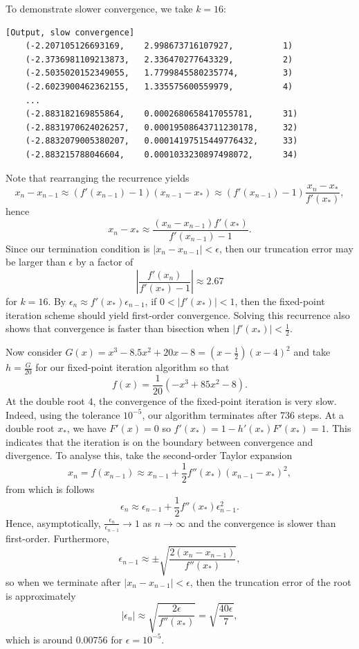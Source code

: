 \documentclass{article}
\begin{document}
To demonstrate slower convergence, we take \(k = 16\):

\begin{verbatim}[Output, slow convergence]
    (-2.207105126693169,    2.998673716107927,          1)
    (-2.3736981109213873,   2.336470277643329,          2)
    (-2.5035020152349055,   1.7799845580235774,         3)
    (-2.6023900462362155,   1.335575600559979,          4)
    ...
    (-2.883182169855864,    0.0002680658417055781,      31)
    (-2.8831970624026257,   0.00019508643711230178,     32)
    (-2.8832079005380207,   0.00014197515449776432,     33)
    (-2.883215788046604,    0.0001033230897498072,      34)
\end{verbatim}

Note that rearranging the recurrence yields
\[ x_n - x_{n-1} \approx (f'(x_{n-1}) - 1)(x_{n-1} - x_*) \approx  (f'(x_{n-1}) - 1) \frac{x_n - x_*}{f'(x_*)}, \]
hence
\[ x_n - x_* \approx \frac{(x_n - x_{n-1})f'(x_*)}{f'(x_{n-1}) - 1}. \]
Since our termination condition is \(|x_n - x_{n-1}| < \epsilon\), then our truncation error may be larger than \(\epsilon\) by a factor of 
\[ \left|\frac{f'(x_n)}{f'(x_*) - 1}\right| \approx 2.67 \]
for \(k = 16\). By \(\epsilon_n \approx f'(x_*) \epsilon_{n-1}\), if \(0 < |f'(x_*)| < 1\), then the fixed-point iteration scheme should yield first-order convergence. Solving this recurrence also shows that convergence is faster than bisection when \(|f'(x_*)| < \frac{1}{2}\).

Now consider \(G(x) = x^3 -8.5x^2 + 20x - 8 = (x - \frac{1}{2})(x - 4)^2\) and take \(h = \frac{G}{20}\) for our fixed-point iteration algorithm so that
\[ f(x) = \frac{1}{20}(-x^3 + 85x^2 - 8). \]
At the double root \(4\), the convergence of the fixed-point iteration is very slow. Indeed, using the tolerance \(10^{-5}\), our algorithm terminates after 736 steps. At a double root \(x_*\), we have \(F'(x) = 0\) so \(f'(x_*) = 1 - h'(x_*)F'(x_*) = 1\). This indicates that the iteration is on the boundary between convergence and divergence. To analyse this, take the second-order Taylor expansion
\[ x_n = f(x_{n-1}) \approx x_{n-1} + \frac{1}{2}f''(x_*)(x_{n-1} - x_*)^2,  \]
from which is follows
\[ \epsilon_n \approx \epsilon_{n-1} + \frac{1}{2} f''(x_*)\epsilon_{n-1}^2. \]
Hence, asymptotically, \(\frac{\epsilon_n}{\epsilon_{n-1}} \to 1\) as \(n \to \infty\) and the convergence is slower than first-order. Furthermore, 
\[ \epsilon_{n-1} \approx \pm \sqrt{\frac{2(x_n - x_{n-1})}{f''(x_*)}}, \]
so when we terminate after \(|x_n - x_{n-1}| < \epsilon\), then the truncation error of the root is approximately
\[ |\epsilon_n| \approx \sqrt{\frac{2\epsilon}{f''(x_*)}} = \sqrt{\frac{40\epsilon}{7}}, \]
which is around \(0.00756\) for \(\epsilon = 10^{-5}\).
\end{document}
